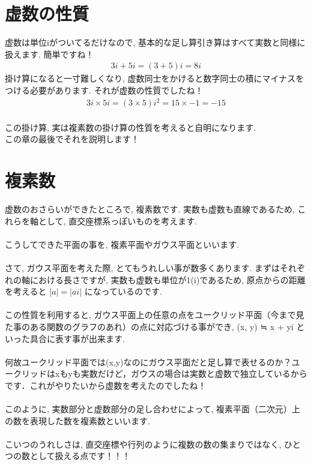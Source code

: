 \documentclass[11pt,a4paper]{jreport}
\begin{document}
\section{虚数の性質}
虚数は単位iがついてるだけなので, 基本的な足し算引き算はすべて実数と同様に扱えます. 簡単ですね！\\
\begin{eqnarray}
3i + 5i  =(3 + 5)i = 8i
\end{eqnarray}
掛け算になると一寸難しくなり, 虚数同士をかけると数字同士の積にマイナスをつける必要があります. それが虚数の性質でしたね！\\
\begin{eqnarray}
3i ×5i = (3×5)i^2 = 15 ×-1 = -15
\end{eqnarray}
\\
この掛け算, 実は複素数の掛け算の性質を考えると自明になります.\\
この章の最後でそれを説明します！\\
\section{複素数}
虚数のおさらいができたところで, 複素数です. 実数も虚数も直線であるため, これらを軸として, 直交座標系っぽいものを考えます.\\
\\
こうしてできた平面の事を, 複素平面やガウス平面といいます.\\
\\
さて, ガウス平面を考えた際, とてもうれしい事が数多くあります. まずはそれぞれの軸における長さですが, 実数も虚数も単位が1(i)であるため, 原点からの距離を考えると $ |a| = |ai| $ になっているのです. \\
\\
この性質を利用すると, ガウス平面上の任意の点をユークリッド平面（今まで見た事のある関数のグラフのあれ）の点に対応づける事ができ, (x, y) ≒ x + yi といった具合に表す事が出来ます. \\
\\
何故ユークリッド平面では(x,y)なのにガウス平面だと足し算で表せるのか？ユークリッドはxもyも実数だけど，ガウスの場合は実数と虚数で独立しているからです．これがやりたいから虚数を考えたのでしたね！\\
\\
このように, 実数部分と虚数部分の足し合わせによって, 複素平面（二次元）上の数を表現した数を複素数といいます.\\
\\
こいつのうれしさは, 直交座標や行列のように複数の数の集まりではなく, ひとつの数として扱える点です！！！\\
\end{document}
